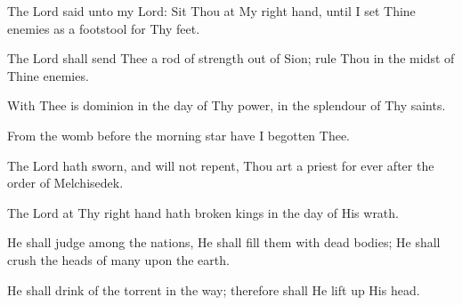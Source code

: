 The Lord said unto my Lord: Sit Thou at My right hand, until I set Thine enemies as a footstool for Thy feet.

The Lord shall send Thee a rod of strength out of Sion; rule Thou in the midst of Thine enemies.

With Thee is dominion in the day of Thy power, in the splendour of Thy saints.

From the womb before the morning star have I begotten Thee.

The Lord hath sworn, and will not repent, Thou art a priest for ever after the order of Melchisedek.

The Lord at Thy right hand hath broken kings in the day of His wrath.

He shall judge among the nations, He shall fill them with dead bodies; He shall crush the heads of many upon the earth.

He shall drink of the torrent in the way; therefore shall He lift up His head.
